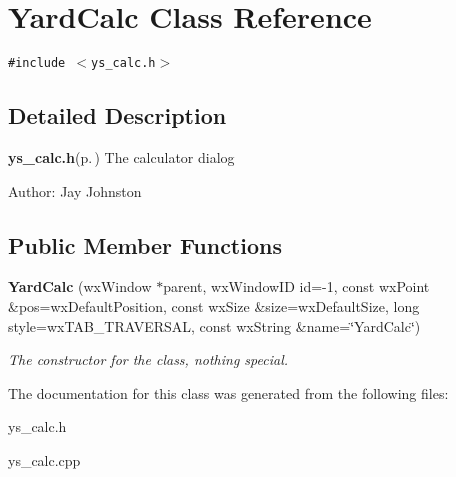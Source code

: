 \section{Yard\-Calc Class Reference}
\label{classYardCalc}
{\tt \#include $<$ys\_\-calc.h$>$}



\subsection{Detailed Description}
{\bf ys\_\-calc.h}{\rm (p.\,\pageref{ys__calc_8h})} The calculator dialog 

\begin{Desc}
\item[Author:]Jay Johnston \end{Desc}


\subsection*{Public Member Functions}
\begin{CompactItemize}
\item 
{\bf Yard\-Calc} (wx\-Window $\ast$parent, wx\-Window\-ID id=-1, const wx\-Point \&pos=wx\-Default\-Position, const wx\-Size \&size=wx\-Default\-Size, long style=wx\-TAB\_\-TRAVERSAL, const wx\-String \&name=\char`\"{}Yard\-Calc\char`\"{})\label{classYardCalc_a0}

\begin{CompactList}\small\item\em The constructor for the class, nothing special. \item\end{CompactList}\end{CompactItemize}


The documentation for this class was generated from the following files:\begin{CompactItemize}
\item 
ys\_\-calc.h\item 
ys\_\-calc.cpp\end{CompactItemize}
